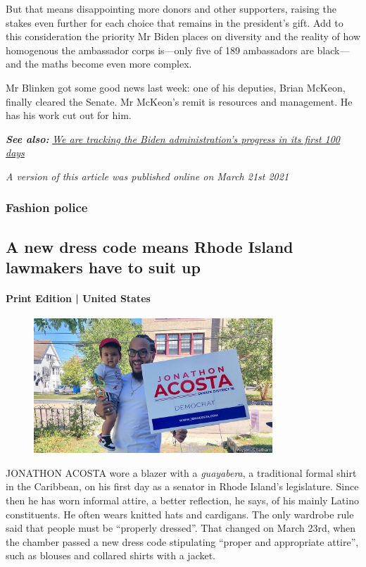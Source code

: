 \documentclass{article}
\begin{document}
But that means disappointing more donors and other supporters, raising the stakes even further for each choice that remains in the president's gift. Add to this consideration the priority Mr Biden places on diversity and the reality of how homogenous the ambassador corps is---only five of 189 ambassadors are black---and the maths become even more complex. 

Mr Blinken got some good news last week: one of his deputies, Brian McKeon, finally cleared the Senate. Mr McKeon's remit is resources and management. He has his work cut out for him. {} 

\textbf{\emph{See also:}} \href{https://www.economist.com/tracking-joe-biden}{\emph{We are tracking the Biden administration's progress in its first 100 days}} 

\emph{A version of this article was published online on March 21st 2021} 
\clearpage
\subsubsection{Fashion police }
\subsection{A new dress code means Rhode Island lawmakers have to suit up }
\paragraph{Print Edition | United States  \quad \color{gray}{Mar 27th 2021 }}
\begin{figure}[h]
\centering
\includegraphics[width=0.8\textwidth]{images/20210327_USP003_0.jpg}
\end{figure}
\lettrine{J} ONATHON ACOSTA wore a blazer with a \emph{guayabera}, a traditional formal shirt in the Caribbean, on his first day as a senator in Rhode Island's legislature. Since then he has worn informal attire, a better reflection, he says, of his mainly Latino constituents. He often wears knitted hats and cardigans. The only wardrobe rule said that people must be ``properly dressed''. That changed on March 23rd, when the chamber passed a new dress code stipulating ``proper and appropriate attire'', such as blouses and collared shirts with a jacket. 
\end{document}
